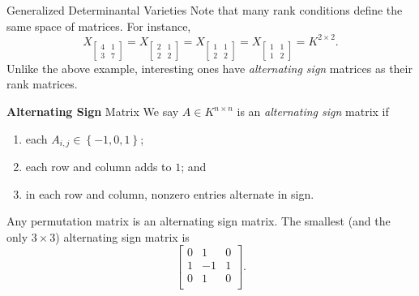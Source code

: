 \documentclass[co439]{subfiles}
\begin{document}
\begin{example}{Generalized Determinantal Varieties}
        Note that many rank conditions define the same space of matrices. For instance,
        \begin{equation*}
            X_{\begin{bmatrix} 4 & 1 \\ 3 & 7 \end{bmatrix}} 
            = X_{\begin{bmatrix} 2 & 1 \\ 2 & 2 \end{bmatrix}}
            = X_{\begin{bmatrix} 1 & 1 \\ 2 & 2 \end{bmatrix}}
            = X_{\begin{bmatrix} 1 & 1 \\ 1 & 2 \end{bmatrix}}
            = K^{2\times 2}.
        \end{equation*}
        Unlike the above example, interesting ones have \textit{alternating sign} matrices as their rank matrices.
    \end{example}

    \rruleline

    \begin{definition}{\textbf{Alternating Sign} Matrix}
        We say $A\in K^{n\times n}$ is an \emph{alternating sign} matrix if
        \begin{enumerate}
            \item each $A_{i,j}\in\left\lbrace -1,0,1 \right\rbrace$;
            \item each row and column adds to $1$; and
            \item in each row and column, nonzero entries alternate in sign.
        \end{enumerate}
    \end{definition}

    \begin{example}{}
        Any permutation matrix is an alternating sign matrix. The smallest (and the only $3\times 3$) alternating sign matrix is
        \begin{equation*}
            \begin{bmatrix}
                    0 & 1 & 0 \\
                    1 & -1 & 1 \\
                    0 & 1 & 0 \\
            \end{bmatrix}.
        \end{equation*}
    \end{example}
\end{document}
